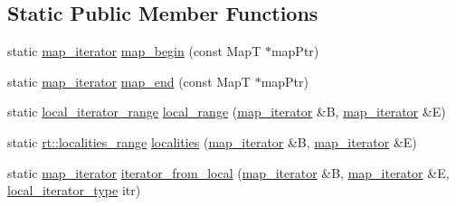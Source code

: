 \subsection*{Static Public Member Functions}
\begin{DoxyCompactItemize}
\item 
static \hyperlink{classshad_1_1map__iterator}{map\-\_\-iterator} \hyperlink{classshad_1_1map__iterator_a57d139353cfaa75639f6445a0e138c7d}{map\-\_\-begin} (const Map\-T $\ast$map\-Ptr)
\item 
static \hyperlink{classshad_1_1map__iterator}{map\-\_\-iterator} \hyperlink{classshad_1_1map__iterator_a3f9cd178ba9a8d529844cf215be6a79b}{map\-\_\-end} (const Map\-T $\ast$map\-Ptr)
\item 
static \hyperlink{classshad_1_1map__iterator_1_1local__iterator__range}{local\-\_\-iterator\-\_\-range} \hyperlink{classshad_1_1map__iterator_aae44fbc7ffd3ceb7cb80a8661cb74c34}{local\-\_\-range} (\hyperlink{classshad_1_1map__iterator}{map\-\_\-iterator} \&B, \hyperlink{classshad_1_1map__iterator}{map\-\_\-iterator} \&E)
\item 
static \hyperlink{classshad_1_1rt_1_1localities__range}{rt\-::localities\-\_\-range} \hyperlink{classshad_1_1map__iterator_ae809bb004b5f198eae11dfe7ac9c5f8a}{localities} (\hyperlink{classshad_1_1map__iterator}{map\-\_\-iterator} \&B, \hyperlink{classshad_1_1map__iterator}{map\-\_\-iterator} \&E)
\item 
static \hyperlink{classshad_1_1map__iterator}{map\-\_\-iterator} \hyperlink{classshad_1_1map__iterator_af5d464e76c35e666c792bb948f5d6739}{iterator\-\_\-from\-\_\-local} (\hyperlink{classshad_1_1map__iterator}{map\-\_\-iterator} \&B, \hyperlink{classshad_1_1map__iterator}{map\-\_\-iterator} \&E, \hyperlink{classshad_1_1map__iterator_adceb72a3948aa860edd3a4c9ceca821d}{local\-\_\-iterator\-\_\-type} itr)
\end{DoxyCompactItemize}


